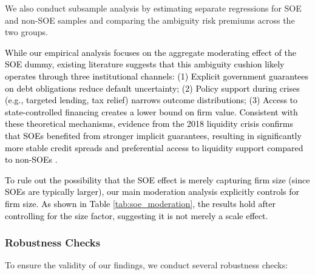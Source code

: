 \documentclass[preprint,12pt,authoryear]{elsarticle}
\begin{document}
We also conduct subsample analysis by estimating separate regressions for SOE and non-SOE samples and comparing the ambiguity risk premiums across the two groups.

\textcolor{black}{While our empirical analysis focuses on the aggregate moderating effect of the SOE dummy, existing literature suggests that this ambiguity cushion likely operates through three institutional channels: (1) Explicit government guarantees on debt obligations reduce default uncertainty; (2) Policy support during crises (e.g., targeted lending, tax relief) narrows outcome distributions; (3) Access to state-controlled financing creates a lower bound on firm value. Consistent with these theoretical mechanisms, evidence from the 2018 liquidity crisis confirms that SOEs benefited from stronger implicit guarantees, resulting in significantly more stable credit spreads and preferential access to liquidity support compared to non-SOEs \citep{Geng2024}.}

\textcolor{black}{To rule out the possibility that the SOE effect is merely capturing firm size (since SOEs are typically larger), our main moderation analysis explicitly controls for firm size. As shown in Table \ref{tab:soe_moderation}, the results hold after controlling for the size factor, suggesting it is not merely a scale effect.}

\subsubsection{Robustness Checks}
\label{sec:robustness}

To ensure the validity of our findings, we conduct several robustness checks:
\end{document}
